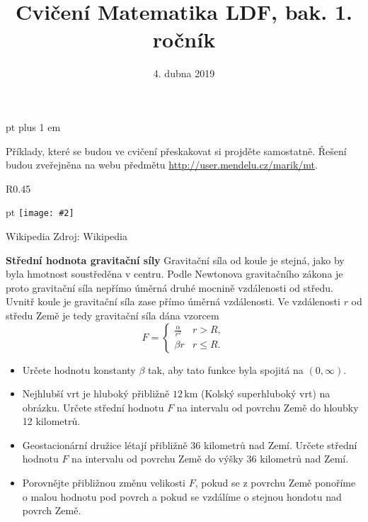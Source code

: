 \documentclass{article}
\def\zlomek{0.45}
\def\nic{}
\newcommand\obrazek[2][pixabay.com]{
  \clearpage
  \def\test{#1}
\begin{wrapfigure}{R}{\zlomek\linewidth}
  \begin{minipage}{1.0\linewidth}\parskip 0 pt
  \texttt{[image: \#2]}

  \vspace*{-10pt}
  \ifx\test\nic\else
  \null\hfill{\color{gray}\footnotesize Zdroj: #1}
  \fi

  \mezera
  \end{minipage}
\end{wrapfigure}
}
\let\oldtextbf\textbf
\def\textbf#1{%
  \oldtextbf{\color{red} #1}}
\def\mezera{\vspace*{10pt}}
\begin{document}
 pt plus 1 em
\title{Cvičení Matematika LDF, bak. 1. ročník}
\date{4. dubna 2019}
\maketitle

Příklady, které se budou ve cvičení přeskakovat si projděte
samostatně. Řešení budou zveřejněna na webu předmětu \url{http://user.mendelu.cz/marik/mt}.

\newpage


\def\tg{\mathop{\mathrm{tg}}}
\def\cotg{\mathop{\mathrm{cotg}}}
\def\arctg{\mathop{\mathrm{arctg}}}


\newpage

\def\mezera{\vspace*{-20pt}}


\obrazek[Wikipedia]{vrt.jpg}

\textbf{Střední hodnota gravitační síly}
Gravitační síla od koule je stejná, jako by byla hmotnost soustředěna
v centru. Podle Newtonova gravitačního zákona je proto gravitační síla
nepřímo úměrná druhé mocnině vzdálenosti od středu.
Uvnitř koule je gravitační síla zase přímo úměrná vzdálenosti. Ve vzdálenosti $r$ od středu Země je tedy gravitační síla dána vzorcem
$$F=
\begin{cases}
    \frac{\alpha}{r^2} & r>R,\\
  \beta r & r\leq R.
\end{cases}
$$

\vspace*{-10pt}
\begin{itemize} pt
\item Určete hodnotu konstanty $\beta$ tak, aby tato funkce byla
  spojitá na $(0,\infty)$. 
\item Nejhlubší vrt je hluboký přibližně $12\,\mathrm{km}$ (Kolský superhluboký vrt) na obrázku. Určete
střední hodnotu $F$ na intervalu od povrchu Země do hloubky
12 kilometrů.  
\item Geostacionární družice létají přibližně 36 kilometrů nad
Zemí. Určete střední hodnotu $F$ na intervalu od povrchu
Země do výšky 36 kilometrů nad Zemí.
\item Porovnějte přibližnou změnu velikosti $F$, pokud se z povrchu Země ponoříme o malou hodnotu pod povrch a pokud se vzdálíme o stejnou hondotu nad povrch Země.
\end{itemize}

\newpage

\def\mezera{\vspace*{-20pt}}
\end{document}
